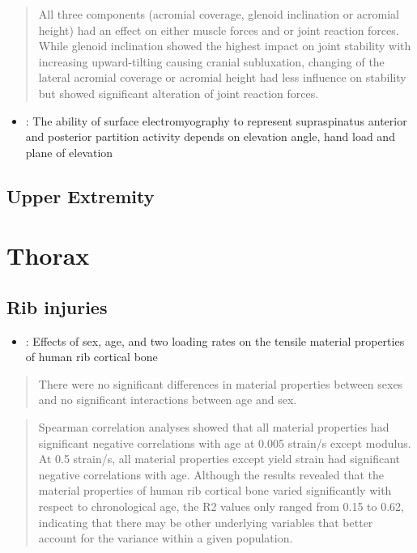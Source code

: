 \documentclass[]{book}
\providecommand{\tightlist}{%
  \setlength{\itemsep}{0pt}\setlength{\parskip}{0pt}}
\begin{document}
\begin{quote}
All three components (acromial coverage, glenoid inclination or acromial height) had an effect on either muscle forces and or joint reaction forces. While glenoid inclination showed the highest impact on joint stability with increasing upward-tilting causing cranial subluxation, changing of the lateral acromial coverage or acromial height had less influence on stability but showed significant alteration of joint reaction forces.
\end{quote}

\begin{itemize}
\tightlist
\item
  \citet{Cudlip2019}: The ability of surface electromyography to represent supraspinatus anterior and posterior partition activity depends on elevation angle, hand load and plane of elevation
\end{itemize}

\hypertarget{upper-extremity}{%
\section{Upper Extremity}\label{upper-extremity}}

\hypertarget{thorax}{%
\chapter{Thorax}\label{thorax}}

\hypertarget{rib-injuries}{%
\section{Rib injuries}\label{rib-injuries}}

\begin{itemize}
\tightlist
\item
  \citet{Katzenberger2020}: Effects of sex, age, and two loading rates on the tensile material properties of human rib cortical bone
\end{itemize}

\begin{quote}
There were no significant differences in material properties between sexes and no significant interactions between age and sex.
\end{quote}

\begin{quote}
Spearman correlation analyses showed that all material properties had significant negative correlations with age at 0.005 strain/s except modulus. At 0.5 strain/s, all material properties except yield strain had significant negative correlations with age. Although the results revealed that the material properties of human rib cortical bone varied significantly with respect to chronological age, the R2 values only ranged from 0.15 to 0.62, indicating that there may be other underlying variables that better account for the variance within a given population.
\end{quote}
\end{document}
